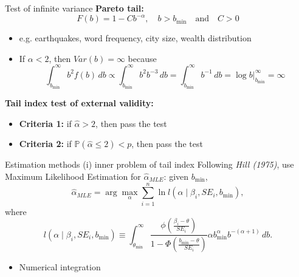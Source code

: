 \documentclass{beamer} %
\begin{document}
\begin{frame}{Test of infinite variance}
    \textbf{Pareto tail:}
    \[
    F(b) = 1 - Cb^{-\alpha}, \quad b > b_{\text{min}} \quad \text{and} \quad C > 0
    \]

    \begin{itemize}
        \item e.g. earthquakes, word frequency, city size, wealth distribution
        \item If $\alpha < 2$, then $V\!ar(b) = \infty$ because
        \[
        \int_{b_{\text{min}}}^\infty b^2 f(b) \, db \propto \int_{b_{\text{min}}}^\infty b^2 b^{-3} \, db = \int_{b_{\text{min}}}^\infty b^{-1} \, db = \log b \big|_{b_{\text{min}}}^\infty = \infty
        \]
    \end{itemize}
    
    \bigskip
    
    \textbf{Tail index test of external validity:}
    \begin{itemize}
        \item \textbf{Criteria 1:} if $\hat{\alpha} > 2$, then pass the test
        \item \textbf{Criteria 2:} if $\mathbb{P}(\hat{\alpha} \leq 2) < p$, then pass the test
    \end{itemize}
\end{frame}


\begin{frame}{Estimation methods (i) inner problem of tail index}
    Following \textit{Hill (1975)}, use Maximum Likelihood Estimation for $\hat{\alpha}_{MLE}$: given $b_{\text{min}}$,
    \[
    \hat{\alpha}_{MLE} = \arg \max_{\alpha} \sum_{i=1}^n \ln l \left( \alpha \mid \beta_i, SE_i, b_{\text{min}} \right),
    \]
    where
    \[
    l \left( \alpha \mid \beta_i, SE_i, b_{\text{min}} \right) \equiv \int_{\theta_{\text{min}}}^\infty
    \frac{\phi \left( \frac{\beta_i - \theta}{SE_i} \right)}{1 - \Phi \left( \frac{b_{\text{min}} - \theta}{SE_i} \right)}
    \alpha b_{\text{min}}^{\alpha} b^{-(\alpha + 1)} \, db.
    \]

    \bigskip

    \begin{itemize}
        \item Numerical integration
    \end{itemize}
\end{frame}
\end{document}
